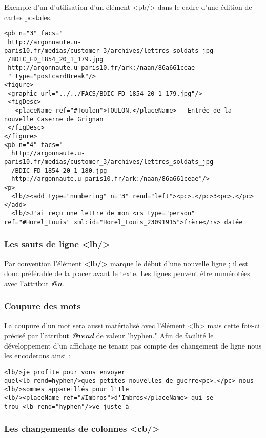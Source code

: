 \documentclass[18pt,a4paper,oneside]{book} %
\begin{document}
Exemple d'un d'utilisation d'un élément <pb/> dans le cadre d'une édition de cartes postales.
\begin{lstlisting}
<pb n="3" facs="
 http://argonnaute.u-paris10.fr/medias/customer_3/archives/lettres_soldats_jpg
 /BDIC_FD_1854_20_1_179.jpg
 http://argonnaute.u-paris10.fr/ark:/naan/86a661ceae
 " type="postcardBreak"/>
<figure>
 <graphic url="../../FACS/BDIC_FD_1854_20_1_179.jpg"/>
 <figDesc>
   <placeName ref="#Toulon">TOULON.</placeName> - Entrée de la nouvelle Caserne de Grignan
 </figDesc>
</figure>
<pb n="4" facs="
  http://argonnaute.u-paris10.fr/medias/customer_3/archives/lettres_soldats_jpg
  /BDIC_FD_1854_20_1_180.jpg
  http://argonnaute.u-paris10.fr/ark:/naan/86a661ceae"/>
<p>
  <lb/><add type="numbering" n="3" rend="left"><pc>.</pc>3<pc>.</pc></add>
  <lb/>J'ai reçu une lettre de mon <rs type="person" ref="#Horel_Louis" xml:id="Horel_Louis_23091915">frère</rs> datée
\end{lstlisting} 
\subsubsection{Les sauts de ligne <lb/>}

Par convention l'élément \textbf{<lb/>} marque le début d'une nouvelle ligne ; il est donc préférable de la placer avant le texte. Les lignes peuvent être numérotées avec l'attribut \textit{\textbf{@n}}.

\subsubsection{Coupure des mots}

La coupure d'un mot sera aussi matérialisé avec l'élément <lb> mais cette fois-ci précisé par l'attribut \textit{\textbf{@rend}} de valeur "hyphen." Afin de facilité le développement d'un affichage ne tenant pas compte des changement de ligne nous les encoderons ainsi : 

\begin{lstlisting}
<lb/>je profite pour vous envoyer 
quel<lb rend=hyphen/>ques petites nouvelles de guerre<pc>.</pc> nous
<lb/>sommes appareillés pour l'Ile
<lb/><placeName ref="#Imbros">d'Imbros</placeName> qui se 
trou-<lb rend="hyphen"/>ve juste à
\end{lstlisting}

\subsubsection{Les changements de colonnes <cb/>}
\end{document}

